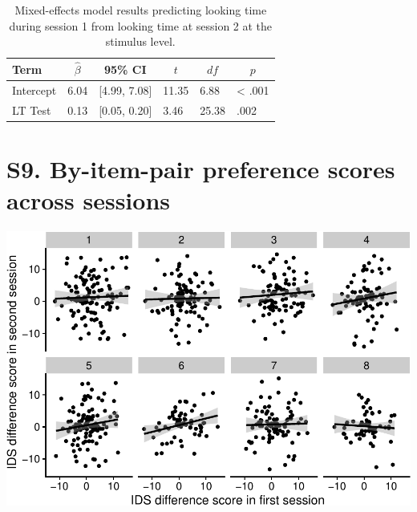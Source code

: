 \documentclass[
  man, donotrepeattitle,floatsintext]{apa6}
\begin{document}
\begin{table}[tbp]

\begin{center}
\begin{threeparttable}

\caption{\label{tab:unnamed-chunk-19}Mixed-effects model results predicting looking time during session 1 from looking time at session 2 at the stimulus level.}

\begin{tabular}{llllll}
\toprule
Term & \multicolumn{1}{c}{$\hat{\beta}$} & \multicolumn{1}{c}{95\% CI} & \multicolumn{1}{c}{$t$} & \multicolumn{1}{c}{$\mathit{df}$} & \multicolumn{1}{c}{$p$}\\
\midrule
Intercept & 6.04 & {}[4.99, 7.08] & 11.35 & 6.88 & < .001\\
LT Test & 0.13 & {}[0.05, 0.20] & 3.46 & 25.38 & .002\\
\bottomrule
\end{tabular}

\end{threeparttable}
\end{center}

\end{table}

\hypertarget{s9.-by-item-pair-preference-scores-across-sessions}{%
\section{S9. By-item-pair preference scores across sessions}\label{s9.-by-item-pair-preference-scores-across-sessions}}

\includegraphics{MB1T_supplement_files/figure-latex/unnamed-chunk-20-1.pdf}
\end{document}
